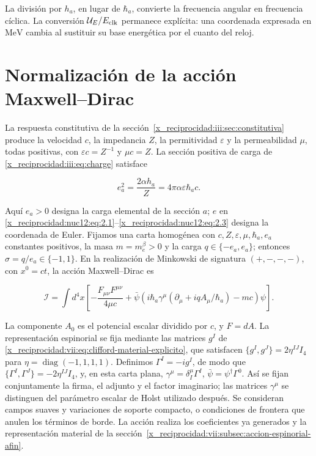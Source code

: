 La división por \(h_a\), en lugar de \(\hbar_a\), convierte la frecuencia angular en frecuencia cíclica. La conversión \(\mathcal U_E/E_{\rm clk}\) permanece explícita: una coordenada expresada en \(\mathrm{MeV}\) cambia al sustituir su base energética por el cuanto del reloj.

\section{Normalización de la acción Maxwell--Dirac}

La respuesta constitutiva de la sección~\ref{x_reciprocidad:iii:sec:constitutiva} produce la velocidad \(c\), la impedancia \(Z\), la permitividad \(\varepsilon\) y la permeabilidad \(\mu\), todas positivas, con \(\varepsilon c=Z^{-1}\) y \(\mu c=Z\). La sección positiva de carga de \eqref{x_reciprocidad:iii:eq:charge} satisface



\begin{equation}
e_a^2=\frac{2\alpha h_a}{Z}
=4\pi\alpha\varepsilon\hbar_a c .
\label{x_reciprocidad:nuc12:eq:3.1}
\end{equation}



Aquí \(e_a>0\) designa la carga elemental de la sección \(a\); \(e\) en \eqref{x_reciprocidad:nuc12:eq:2.1}--\eqref{x_reciprocidad:nuc12:eq:2.3} designa la coordenada de Euler. Fijamos una carta homogénea con \(c,Z,\varepsilon,\mu,\hbar_a,e_a\) constantes positivos, la masa \(m=m_e^\beta>0\) y la carga \(q\in\{-e_a,e_a\}\); entonces \(\sigma=q/e_a\in\{-1,1\}\). En la realización de Minkowski de signatura \((+,-,-,-)\), con \(x^0=ct\), la acción Maxwell--Dirac es



\begin{equation}
\mathcal I=\int d^4x\left[
-\frac{F_{\mu\nu}F^{\mu\nu}}{4\mu c}
+\bar\psi\left(i\hbar_a\gamma^\mu
(\partial_\mu+iqA_\mu/\hbar_a)-mc\right)\psi
\right].
\label{x_reciprocidad:nuc12:eq:3.2}
\end{equation}



La componente \(A_0\) es el potencial escalar dividido por \(c\), y \(F=dA\). La representación espinorial se fija mediante las matrices \(g^I\) de \eqref{x_reciprocidad:vii:eq:clifford-material-explicito}, que satisfacen \(\{g^I,g^J\}=2\eta^{IJ}I_4\) para \(\eta=\operatorname{diag}(-1,1,1,1)\). Definimos \(\Gamma^I=-ig^I\), de modo que \(\{\Gamma^I,\Gamma^J\}=-2\eta^{IJ}I_4\), y, en esta carta plana, \(\gamma^\mu=\delta^\mu_I\Gamma^I\), \(\bar\psi=\psi^\dagger\Gamma^0\). Así se fijan conjuntamente la firma, el adjunto y el factor imaginario; las matrices \(\gamma^\mu\) se distinguen del parámetro escalar de Holst utilizado después. Se consideran campos suaves y variaciones de soporte compacto, o condiciones de frontera que anulen los términos de borde. La acción realiza los coeficientes ya generados y la representación material de la sección~\ref{x_reciprocidad:vii:subsec:accion-espinorial-afin}.

